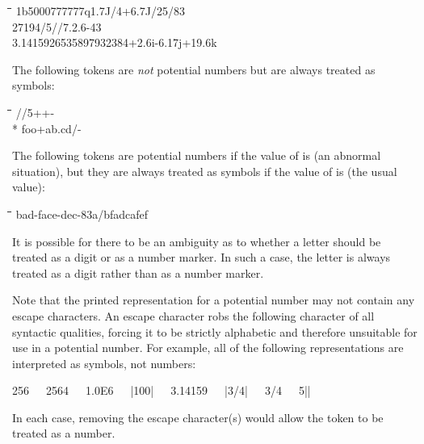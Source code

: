 \begin{lisp}
\linewidth\=\linewidth\=\linewidth\=\linewidth\=\kill
1b5000\>777777q\>1.7J/4+6.7J/25/83 \\
27{\Xcircumflex}194/5//7.2.6\>{\Xcircumflex}-43{\Xcircumflex} \\
3.141{\Xunderscore}592{\Xunderscore}653{\Xunderscore}589{\Xunderscore}793{\Xunderscore}238{\Xunderscore}4\>\>+2.6i-6.17j+19.6k
\end{lisp}
The following tokens are {\it not} potential numbers but are always
treated as symbols:
\begin{lisp}
\linewidth\=\linewidth\=\linewidth\=\linewidth\=\kill
/\>/5\>++- \\*
foo+\>ab.cd\>{\Xunderscore}\>{\Xcircumflex}\>{\Xcircumflex}/-
\end{lisp}
The following tokens are potential numbers if the value of
 is  (an abnormal situation), but they are
always treated as symbols if the value of 
is  (the usual value):
\begin{lisp}
\linewidth\=\linewidth\=\linewidth\=\linewidth\=\kill
bad-face-dec-83\>a/b\>fad{\Xunderscore}cafe\>f{\Xcircumflex}
\end{lisp}
It is possible for there to be an ambiguity as to whether
a letter should be treated as a digit or as a number marker.
In such a case, the letter is always treated as a digit
rather than as a number marker.

Note that the printed representation for a potential
number may not contain any escape characters.
An escape character robs the following character of all syntactic
qualities, forcing it to be strictly alphabetic and therefore unsuitable
for use in a potential number.  For example,
all of the following representations are interpreted as symbols, not numbers:
\begin{lisp}
{\Xbackslash}256~~~25{\Xbackslash}64~~~1.0{\Xbackslash}E6~~~|100|~~~3{\Xbackslash}.14159~~~|3/4|~~~3{\Xbackslash}/4~~~5||
\end{lisp}
In each case, removing the escape character(s) would allow the token
to be treated as a number.

